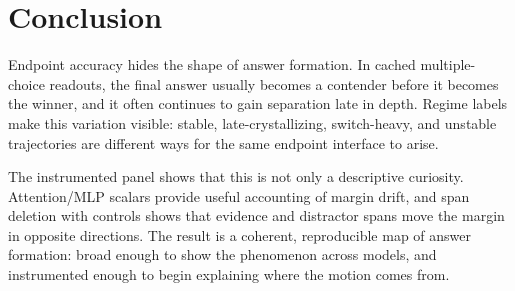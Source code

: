 \section{Conclusion}

Endpoint accuracy hides the shape of answer formation. In cached multiple-choice readouts, the final answer usually becomes a contender before it becomes the winner, and it often continues to gain separation late in depth. Regime labels make this variation visible: stable, late-crystallizing, switch-heavy, and unstable trajectories are different ways for the same endpoint interface to arise.

The instrumented panel shows that this is not only a descriptive curiosity. Attention/MLP scalars provide useful accounting of margin drift, and span deletion with controls shows that evidence and distractor spans move the margin in opposite directions. The result is a coherent, reproducible map of answer formation: broad enough to show the phenomenon across models, and instrumented enough to begin explaining where the motion comes from.
